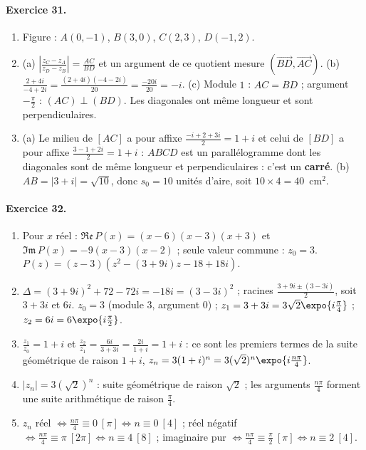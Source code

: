 \begin{corrige}
\paragraph{Exercice 31.}
\begin{enumerate}
\item Figure : $A(0,-1)$, $B(3,0)$, $C(2,3)$, $D(-1,2)$.
\item (a) $\left|\frac{z_C - z_A}{z_D - z_B}\right| = \frac{AC}{BD}$ et un argument de ce quotient mesure $\left(\overrightarrow{BD},\overrightarrow{AC}\right)$.
      (b) $\frac{2 + 4i}{-4 + 2i} = \frac{(2+4i)(-4-2i)}{20} = \frac{-20i}{20} = -i$.
      (c) Module $1$ : $AC = BD$ ; argument $-\frac{\pi}{2}$ : $(AC) \perp (BD)$. Les diagonales ont m\^eme longueur et sont perpendiculaires.
\item (a) Le milieu de $[AC]$ a pour affixe $\frac{-i + 2 + 3i}{2} = 1 + i$ et celui de $[BD]$ a pour affixe $\frac{3 - 1 + 2i}{2} = 1 + i$ :
      $ABCD$ est un parall\'elogramme dont les diagonales sont de m\^eme longueur et perpendiculaires : c'est un \textbf{carr\'e}.
      (b) $AB = |3 + i| = \sqrt{10}$, donc $s_0 = 10$ unit\'es d'aire, soit $10 \times 4 = 40$~cm$^2$.
\end{enumerate}

\paragraph{Exercice 32.}
\begin{enumerate}
\item Pour $x$ r\'eel : $\mathfrak{Re}\,P(x) = (x - 6)(x - 3)(x + 3)$ et $\mathfrak{Im}\,P(x) = -9(x - 3)(x - 2)$ ; seule valeur commune : $z_0 = 3$.
      $P(z) = (z - 3)\left(z^2 - (3 + 9i)z - 18 + 18i\right)$.
\item $\Delta = (3 + 9i)^2 + 72 - 72i = -18i = (3 - 3i)^2$ ; racines $\frac{3 + 9i \pm (3 - 3i)}{2}$, soit $3 + 3i$ et $6i$.
      $z_0 = 3$ (module $3$, argument $0$) ; $z_1 = 3 + 3i = 3\sqrt{2}\expo{i\frac{\pi}{4}}$ ; $z_2 = 6i = 6\expo{i\frac{\pi}{2}}$.
\item $\frac{z_1}{z_0} = 1 + i$ et $\frac{z_2}{z_1} = \frac{6i}{3 + 3i} = \frac{2i}{1 + i} = 1 + i$ : ce sont les premiers termes de la suite g\'eom\'etrique de raison $1 + i$,
      $z_n = 3(1 + i)^n = 3(\sqrt{2})^n\expo{i\frac{n\pi}{4}}$.
\item $|z_n| = 3(\sqrt{2})^n$ : suite g\'eom\'etrique de raison $\sqrt{2}$ ; les arguments $\frac{n\pi}{4}$ forment une suite arithm\'etique de raison $\frac{\pi}{4}$.
\item $z_n$ r\'eel $\iff \frac{n\pi}{4} \equiv 0\ [\pi] \iff n \equiv 0\ [4]$ ; r\'eel n\'egatif $\iff \frac{n\pi}{4} \equiv \pi\ [2\pi] \iff n \equiv 4\ [8]$ ;
      imaginaire pur $\iff \frac{n\pi}{4} \equiv \frac{\pi}{2}\ [\pi] \iff n \equiv 2\ [4]$.
\end{enumerate}


\end{corrige}
